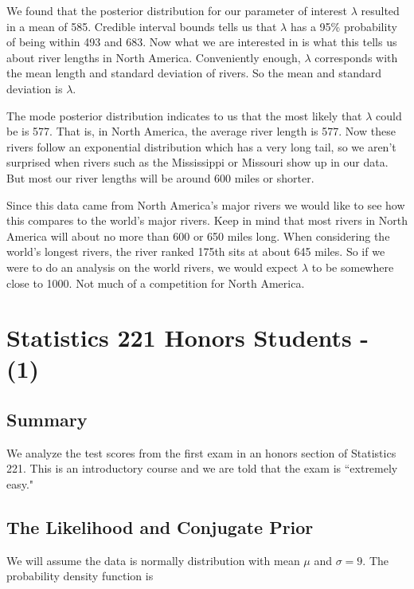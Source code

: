 \documentclass[12pt]{article}
\begin{document}
\noindent We found that the posterior distribution for our parameter of interest $\lambda$ resulted in a mean of 585.  Credible interval bounds tells us that $\lambda$ has a 95\% probability of being within 493 and 683.  Now what we are interested in is what this tells us about river lengths in North America.  Conveniently enough, $\lambda$ corresponds with the mean length and standard deviation of rivers.  So the mean and standard deviation is $\lambda$.
\bigskip

\noindent The mode posterior distribution indicates to us that the most likely that $\lambda$ could be is 577.  That is, in North America, the average river length is 577.  Now these rivers follow an exponential distribution which has a very long tail, so we aren't surprised when rivers such as the Mississippi or Missouri show up in our data.  But most our river lengths will be around 600 miles or shorter.
\bigskip

\noindent Since this data came from North America's major rivers we would like to see how this compares to the world's major rivers.  Keep in mind that most rivers in North America will about no more than 600 or 650 miles long.  When considering the world's longest rivers, the river ranked 175th sits at about 645 miles.  So if we were to do an analysis on the world rivers, we would expect $\lambda$ to be somewhere close to 1000.  Not much of a competition for North America.

\newpage

\section{Statistics 221 Honors Students - (1)}

\subsection{Summary}

\noindent We analyze the test scores from the first exam in an honors section of Statistics 221.  This is an introductory course and we are told that the exam is ``extremely easy."

\subsection{The Likelihood and Conjugate Prior}

\noindent We will assume the data is normally distribution with mean $\mu$ and $\sigma=9$.  The probability density function is
\end{document}
